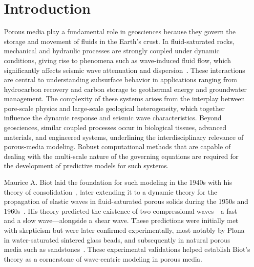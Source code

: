 \documentclass[pdflatex,sn-mathphys-num]{sn-jnl}
\theoremstyle{thmstyleone}%
\theoremstyle{thmstyletwo}%
\theoremstyle{thmstylethree}%
\theoremstyle{definition}
\begin{document}
	
	
	
	\maketitle
	
	
	
	\section{Introduction}
	
	
	
	Porous media play a fundamental role in geosciences because they govern the storage and movement of fluids in the Earth’s crust. In fluid-saturated rocks, mechanical and hydraulic processes are strongly coupled under dynamic conditions, giving rise to phenomena such as wave-induced fluid flow, which significantly affects seismic wave attenuation and dispersion~\cite{pride2004, muller2010seismic}. These interactions are central to understanding subsurface behavior in applications ranging from hydrocarbon recovery and carbon storage to geothermal energy and groundwater management. The complexity of these systems arises from the interplay between pore-scale physics and large-scale geological heterogeneity, which together influence the dynamic response and seismic wave characteristics. Beyond geosciences, similar coupled processes occur in biological tissues, advanced materials, and engineered systems, underlining the interdisciplinary relevance of porous-media modeling. 
	Robust computational methods that are capable of dealing with the multi-scale nature of the governing equations are required for the development of predictive models for such systems. 
	
	Maurice A. Biot laid the foundation for such modeling in the 1940s with his theory of consolidation~\cite{Biot1941}, later extending it to a dynamic theory for the propagation of elastic waves in fluid-saturated porous solids during the 1950s and 1960s~\cite{Biot1956a,Biot1956b,Biot1962}. His theory predicted the existence of two compressional waves—a fast and a slow wave—alongside a shear wave. These predictions were initially met with skepticism but were later confirmed experimentally, most notably by Plona~\cite{Plona1980} in water-saturated sintered glass beads, and subsequently in natural porous media such as sandstones~\cite{Kelder1997, bouzidi2009}. These experimental validations helped establish Biot’s theory as a cornerstone of wave-centric modeling in porous media.
	
\end{document}
